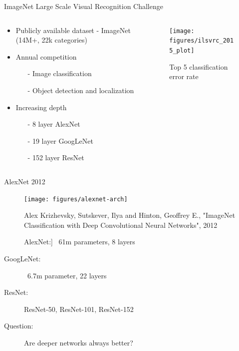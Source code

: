 \begin{frame}{ImageNet Large Scale Visual Recognition Challenge}
	\begin{columns}
		\begin{column}{.5\textwidth}
			\begin{itemize}
				\item Publicly available dataset - ImageNet (14M+, 22k categories)
				\item Annual competition 
				\begin{itemize}
					\item[-] Image classification 
					\item[-] Object detection and localization
				\end{itemize}
				\item Increasing depth 
				\begin{itemize}
					\item[-] 8 layer AlexNet
					\item[-] 19 layer  GoogLeNet
					\item[-] 152 layer ResNet 
				\end{itemize}
			\end{itemize}
		\end{column}
		\begin{column}{.5\textwidth}
			\begin{figure}
				\texttt{[image: figures/ilsvrc\_2015\_plot]}
				\caption*{Top 5 classification error rate}
			\end{figure}
		\end{column}
	\end{columns}
\end{frame}

\begin{frame}{AlexNet 2012}
	\begin{figure}
		\texttt{[image: figures/alexnet-arch]}
		\caption*{{\tiny Alex Krizhevsky, Sutskever, Ilya and Hinton, Geoffrey E., "ImageNet Classification with Deep Convolutional Neural Networks", 2012 }}
	\end{figure}
	\begin{description}
		\item[]AlexNet:] ~61m parameters, 8 layers
		\item[GoogLeNet:] ~6.7m parameter, 22 layers
		\item[ResNet:] ResNet-50, ResNet-101, ResNet-152
		\item[Question:]Are deeper networks always better?
	\end{description}
	
\end{frame}





